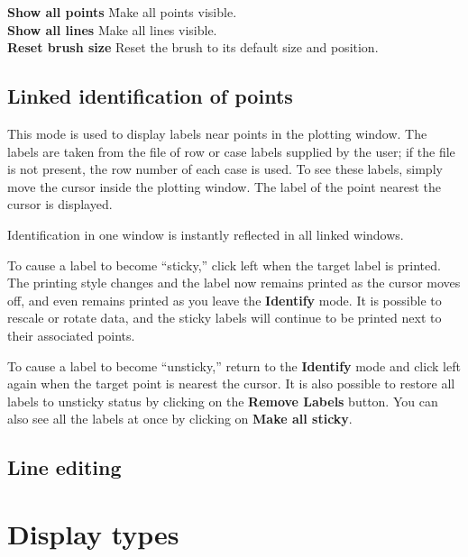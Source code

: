 \documentclass[11pt]{article}
\begin{document}
\begin{tabbing}
 {\bf Show all points} \hspace{.5in} \= Make all points visible. \\
 {\bf Show all lines} \> Make all lines visible. \\
 {\bf Reset brush size} \> Reset the brush to its default size and position. \\
\end{tabbing}
%

\subsection{Linked identification of points}

This mode is used to display labels near points in the plotting
window.  The labels are taken from the file of row or case labels
supplied by the user; if the file is not present, the row number of
each case is used.  To see these labels, simply move the cursor
inside the plotting window.  The label of the point nearest the
cursor is displayed.

Identification in one window is instantly reflected in all linked windows.

To cause a label to become ``sticky,'' click left when the target label
is printed.  The printing style changes and the label now remains
printed as the cursor moves off, and even remains printed as you leave
the {\bf Identify} mode.  It is possible to rescale or rotate data, and
the sticky labels will continue to be printed next to their associated
points.

To cause a label to become ``unsticky,'' return to the {\bf Identify}
mode and click left again when the target point is nearest the cursor.
It is also possible to restore all labels to unsticky status by
clicking on the {\bf Remove Labels} button.  You can also see all the
labels at once by clicking on {\bf Make all sticky}. 

\subsection{Line editing}

\section {Display types}
\end{document}

